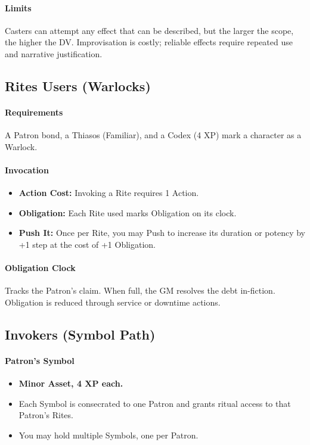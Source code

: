 \paragraph{Limits}
Casters can attempt any effect that can be described, but the larger the scope, the higher the DV. Improvisation is costly; reliable effects require repeated use and narrative justification.

\subsection{Rites Users (Warlocks)}
\paragraph{Requirements}
A Patron bond, a Thiasos (Familiar), and a Codex (4 XP) mark a character as a Warlock. 

\paragraph{Invocation}
\begin{itemize}
  \item \textbf{Action Cost:} Invoking a Rite requires 1 Action. 
  \item \textbf{Obligation:} Each Rite used marks Obligation on its clock. 
  \item \textbf{Push It:} Once per Rite, you may Push to increase its duration or potency by +1 step at the cost of +1 Obligation.
\end{itemize}

\paragraph{Obligation Clock}
Tracks the Patron’s claim. When full, the GM resolves the debt in-fiction. Obligation is reduced through service or downtime actions.

\subsection{Invokers (Symbol Path)}
\paragraph{Patron’s Symbol}
\begin{itemize}
  \item \textbf{Minor Asset, 4 XP each.}
  \item Each Symbol is consecrated to one Patron and grants ritual access to that Patron’s Rites. 
  \item You may hold multiple Symbols, one per Patron.
\end{itemize}

